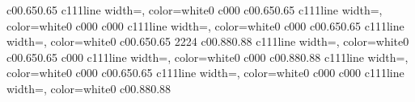 \documentclass{standalone}
\begin{document}
\begin{knitdiagram}
{c}{0}{0.65}{0.65}
{c}{1}{1}{1}{line width=\outlineThickness*\dx, color=white}{0}
{c}{0}{0}{0}
{c}{0}{0.65}{0.65}
{c}{1}{1}{1}{line width=\outlineThickness*\dx, color=white}{0}
{c}{0}{0}{0}
{c}{0}{0}{0}
{c}{1}{1}{1}{line width=\outlineThickness*\dx, color=white}{0}
{c}{0}{0}{0}
{c}{0}{0.65}{0.65}
{c}{1}{1}{1}{line width=\outlineThickness*\dx, color=white}{0}
{c}{0}{0.65}{0.65}
{2}{2}{2}{4}
{c}{0}{0.88}{0.88}
{c}{1}{1}{1}{line width=\outlineThickness*\dx, color=white}{0}
{c}{0}{0.65}{0.65}
{c}{0}{0}{0}
{c}{1}{1}{1}{line width=\outlineThickness*\dx, color=white}{0}
{c}{0}{0}{0}
{c}{0}{0.88}{0.88}
{c}{1}{1}{1}{line width=\outlineThickness*\dx, color=white}{0}
{c}{0}{0}{0}
{c}{0}{0.65}{0.65}
{c}{1}{1}{1}{line width=\outlineThickness*\dx, color=white}{0}
{c}{0}{0}{0}
{c}{0}{0}{0}
{c}{1}{1}{1}{line width=\outlineThickness*\dx, color=white}{0}
{c}{0}{0.88}{0.88}
\end{knitdiagram}
\end{document}
